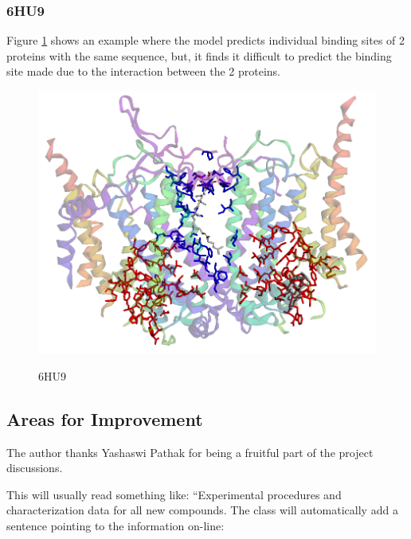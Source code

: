\documentclass[journal=jacsat,manuscript=article]{achemso}
\begin{document}
\subsubsection{6HU9}
\quad Figure \ref{fig:6hu9} shows an example where the model predicts individual binding sites of 2 proteins with the same sequence, but, it finds it difficult to predict the binding site made due to the interaction between the 2 proteins. 
\begin{figure}
    \caption{\centering 6HU9}
    \centering
    \noindent\includegraphics[scale=0.4]{6hu9.png}
    \label{fig:6hu9}
\end{figure}

\subsection{Areas for Improvement}
\quad 

\begin{acknowledgement}
    The author thanks Yashaswi Pathak for being a fruitful part of the project discussions.

\end{acknowledgement}

\begin{suppinfo}

    This will usually read something like: ``Experimental procedures and
    characterization data for all new compounds. The class will
    automatically add a sentence pointing to the information on-line:

\end{suppinfo}
\end{document}
